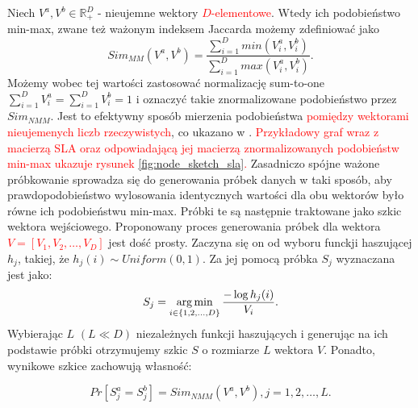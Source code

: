             Niech $V^a, V^b \in \mathbb{R}_{+}^{D}$ - nieujemne wektory \textcolor{red}{$D$-elementowe}. Wtedy ich podobieństwo min-max, zwane też ważonym indeksem Jaccarda możemy zdefiniować jako 
            \begin{equation} \label{eq:sim_mm}  
                Sim_{MM}(V^a, V^b) = \frac{\sum \limits_{i = 1}^D min(V_i^{a}, V_i^{b})}{\sum \limits_{i = 1}^D max(V_i^{a}, V_i^{b})}.
            \end{equation}
            Możemy wobec tej wartości zastosować normalizację sum-to-one $\sum \limits_{i = 1}^D V_{i}^{a} = \sum \limits_{i = 1}^D V_{i}^{b} = 1$ i oznaczyć takie znormalizowane podobieństwo przez $Sim_{NMM}$. Jest to efektywny sposób mierzenia podobieństwa \textcolor{red}{pomiędzy wektorami nieujemenych liczb rzeczywistych}, co ukazano w \cite{10.1145/2783258.2783406}. \textcolor{red}{Przykładowy graf wraz z macierzą SLA oraz odpowiadającą jej macierzą znormalizowanych podobieństw min-max ukazuje rysunek \ref{fig:node_sketch_sla}.} Zasadniczo spójne ważone próbkowanie sprowadza się do generowania próbek danych w taki sposób, aby prawdopodobieństwo wylosowania identycznych wartości dla obu wektorów było równe ich podobieństwu min-max. Próbki te są następnie traktowane jako szkic wektora wejściowego. Proponowany proces generowania próbek dla wektora \textcolor{red}{$V = [V_1, V_2, \dots, V_D]$} jest dość prosty. Zaczyna się on od wyboru funckji haszującej $h_j$, takiej, że $h_j(i) \sim Uniform(0,1)$. Za jej pomocą próbka $S_j$ wyznaczana jest jako:
            \begin{equation} \label{eq:node_sketch_1}  
                S_j = \operatorname*{arg\,min}_{i \in \{1,2,\dots, D\}} \frac{-\log h_{j}(i)}{V_i}.
            \end{equation}
            Wybierając $L$ $(L \ll D)$ niezależnych funkcji haszujących i generując na ich podstawie próbki otrzymujemy szkic $S$ o rozmiarze $L$ wektora $V$. Ponadto, wynikowe szkice zachowują własność:

            \begin{equation} \label{eq:node_sketch_2}  
                Pr[S_{j}^{a} = S_{j}^{b}] = Sim_{NMM}(V^a, V^b), j = 1,2,\dots,L.
            \end{equation}

